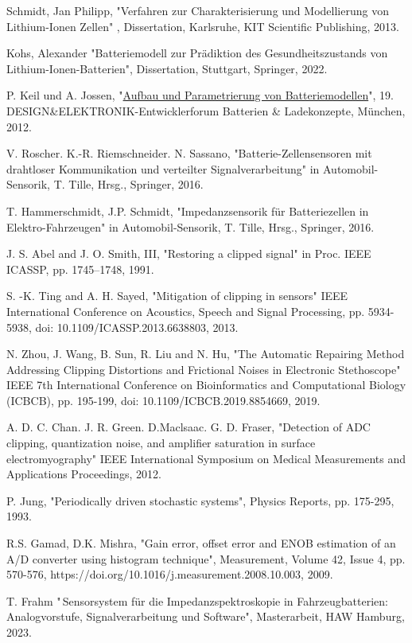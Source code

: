 \begin{thebibliography}{[99]}

	Schmidt, Jan Philipp, "Verfahren zur Charakterisierung und Modellierung von Lithium-Ionen Zellen" , Dissertation, Karlsruhe, KIT Scientific Publishing, 2013.
	
	Kohs, Alexander "Batteriemodell zur Prädiktion des Gesundheitszustands von Lithium-Ionen-Batterien", Dissertation, Stuttgart, Springer, 2022. 
	
	P. Keil und A. Jossen, "\href{https://mediatum.ub.tum.de/doc/1162416/1162416.pdf}{Aufbau und Parametrierung von Batteriemodellen}", 19. DESIGN\&ELEKTRONIK-Entwicklerforum Batterien \& Ladekonzepte, München, 2012.
	
	V. Roscher. K.-R. Riemschneider. N. Sassano, "Batterie-Zellensensoren mit drahtloser Kommunikation und verteilter Signalverarbeitung" in Automobil-Sensorik, T. Tille, Hrsg., Springer, 2016.
	
	T. Hammerschmidt, J.P. Schmidt, "Impedanzsensorik für Batteriezellen in Elektro-Fahrzeugen" in Automobil-Sensorik, T. Tille, Hrsg., Springer, 2016.
	
		
	J. S. Abel and J. O. Smith, III, "Restoring a clipped signal" in
	Proc. IEEE ICASSP, pp. 1745–1748, 1991. 
	
	S. -K. Ting and A. H. Sayed, "Mitigation of clipping in sensors" IEEE International Conference on Acoustics, Speech and Signal Processing, pp. 5934-5938, doi: 10.1109/ICASSP.2013.6638803, 2013.
	
	N. Zhou, J. Wang, B. Sun, R. Liu and N. Hu, "The Automatic Repairing Method Addressing Clipping Distortions and Frictional Noises in Electronic Stethoscope" IEEE 7th International Conference on Bioinformatics and Computational Biology (ICBCB), pp. 195-199, doi: 10.1109/ICBCB.2019.8854669, 2019.
	
	A. D. C. Chan. J. R. Green. D.Maclsaac. G. D. Fraser, "Detection of ADC clipping, quantization noise, and amplifier saturation in surface electromyography" IEEE International Symposium on Medical Measurements and Applications Proceedings, 2012.
	
	P. Jung, "Periodically driven stochastic systems", Physics Reports,  pp. 175-295, 1993.

	R.S. Gamad, D.K. Mishra,
	"Gain error, offset error and ENOB estimation of an A/D converter using histogram technique",
	Measurement, Volume 42, Issue 4, pp. 570-576, https://doi.org/10.1016/j.measurement.2008.10.003, 2009.

	T. Frahm "\,Sensorsystem für die Impedanzspektroskopie in Fahrzeugbatterien: Analogvorstufe, Signalverarbeitung und Software", Masterarbeit, HAW Hamburg, 2023.


	
\end{thebibliography}
	

 
 
